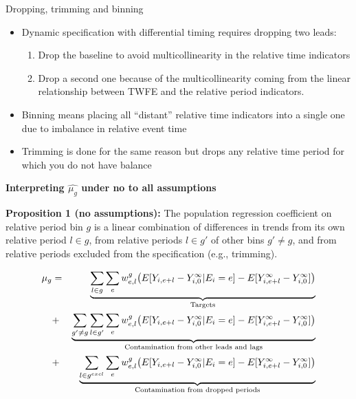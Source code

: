 \documentclass{beamer}
\begin{document}
\begin{frame}{Dropping, trimming and binning}

\begin{itemize}
\item Dynamic specification with differential timing requires dropping two leads: 
	\begin{enumerate}
	\item Drop the baseline to avoid multicollinearity in the relative time indicators 
	\item Drop a second one because of the multicollinearity coming from the linear relationship between TWFE and the relative period indicators.
	\end{enumerate}
\item Binning means placing all ``distant'' relative time indicators into a single one due to imbalance in relative event time
\item Trimming is done for the same reason but drops any relative time period for which you do not have balance
\end{itemize}

\end{frame}

\begin{frame}[plain, shrink=20]
\begin{center}
\textbf{Interpreting $\widehat{\mu_g}$ under no to all assumptions}
\end{center}

\textbf{Proposition 1 (no assumptions):} The population regression coefficient on relative period bin $g$ is a linear combination of differences in trends from its own relative period $l \in g$, from relative periods $l \in g'$ of other bins $g' \neq g$, and from relative periods excluded from the specification (e.g., trimming). 

\begin{eqnarray*}
\mu_g &=& \underbrace{\sum_{l \in g} \sum_{e} w^g_{e,l} \big ( E[Y_{i,e+l} - Y^{\infty}_{i,0} | E_i = e] - E[Y^{\infty}_{i,e+l} - Y^{\infty}_{i,0}] \big )}_{\mathclap{\text{Targets}}} \\
&+& \underbrace{\sum_{g' \neq g} \sum_{l \in g'} \sum_e w^g_{e,l} \big ( E[Y_{i,e+l} - Y^{\infty}_{i,0} | E_i=e] - E[Y^{\infty}_{i,e+l} - Y^{\infty}_{i,0}] \big )}_{\mathclap{\text{Contamination from other leads and lags}}} \\
&+&  \underbrace{\sum_{l \in g^{excl}} \sum_{e} w^g_{e,l} \big ( E[Y_{i,e+l} - Y^{\infty}_{i,0} | E_i=e] - E[Y^{\infty}_{i,e+l} - Y^{\infty}_{i,0}] \big )}_{\mathclap{\text{Contamination from dropped periods}}} 
\end{eqnarray*}

\bigskip


\end{frame}
\end{document}
